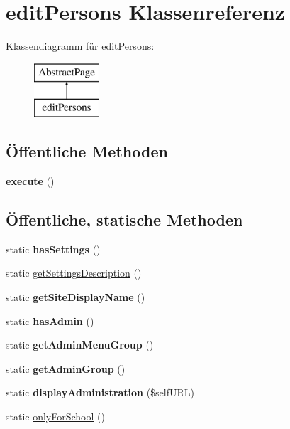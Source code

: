 \hypertarget{classedit_persons}{}\section{edit\+Persons Klassenreferenz}
\label{classedit_persons}
Klassendiagramm für edit\+Persons\+:\begin{figure}[H]
\begin{center}
\leavevmode
\includegraphics[height=2.000000cm]{classedit_persons}
\end{center}
\end{figure}
\subsection*{Öffentliche Methoden}
\begin{DoxyCompactItemize}
\item 
\mbox{\label{classedit_persons_a7daba231ec7d20408d1794f020c9e752}} 
{\bfseries execute} ()
\end{DoxyCompactItemize}
\subsection*{Öffentliche, statische Methoden}
\begin{DoxyCompactItemize}
\item 
\mbox{\label{classedit_persons_a46eaab65b014f0ef20721fd6466106e1}} 
static {\bfseries has\+Settings} ()
\item 
static \mbox{\hyperlink{classedit_persons_a8d9fe31c22a69a365fb355255b3aa8ef}{get\+Settings\+Description}} ()
\item 
\mbox{\label{classedit_persons_ad878b343cd54dfdbb4122a832d60f1a2}} 
static {\bfseries get\+Site\+Display\+Name} ()
\item 
\mbox{\label{classedit_persons_a0cdf94f03e17acc259d36c2aadb40b60}} 
static {\bfseries has\+Admin} ()
\item 
\mbox{\label{classedit_persons_a7b1b575fa11008c698a9fb928ef2efae}} 
static {\bfseries get\+Admin\+Menu\+Group} ()
\item 
\mbox{\label{classedit_persons_a7b870c6249667bcd27c42b5c71460af9}} 
static {\bfseries get\+Admin\+Group} ()
\item 
\mbox{\label{classedit_persons_a73271d7beabd4daae3d37708f48cf42c}} 
static {\bfseries display\+Administration} (\$self\+U\+RL)
\item 
static \mbox{\hyperlink{classedit_persons_a5a2d38aba62f94b134795b8fa31d038f}{only\+For\+School}} ()
\end{DoxyCompactItemize}

